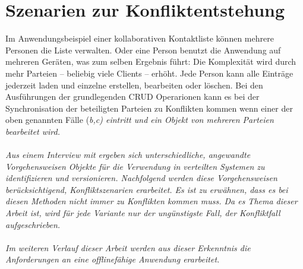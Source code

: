 \section{\label{sec:konfliktszenarien}Szenarien zur Konfliktentstehung}
Im Anwendungsbeispiel einer kollaborativen Kontaktliste können mehrere Personen die Liste verwalten. Oder eine Person benutzt die Anwendung auf mehreren Geräten, was zum selben Ergebnis führt:
Die Komplexität wird durch mehr Parteien -- beliebig viele Clients -- erhöht.
Jede Person kann alle Einträge jederzeit laden und einzelne erstellen, bearbeiten oder löschen. Bei den Ausführungen der grundlegenden \gls{CRUD} Operarionen kann es bei der Synchronisation der beteiligten Parteien zu Konflikten kommen wenn einer der oben genannten Fälle (\it{b,c}) eintritt und ein Objekt von mehreren Parteien bearbeitet wird.\\\\
Aus einem Interview mit  ergeben sich unterschiedliche, angewandte Vorgehensweisen Objekte für die Verwendung in verteilten Systemen zu identifizieren und versionieren. Nachfolgend werden diese Vorgehensweisen berücksichtigend, Konfliktszenarien erarbeitet. Es ist zu erwähnen, dass es bei diesen Methoden nicht immer zu Konflikten kommen muss. Da es Thema dieser Arbeit ist, wird für jede Variante nur der ungünstigste Fall, der Konfliktfall aufgeschrieben.
%
\\\\
Im weiteren Verlauf dieser Arbeit werden aus dieser Erkenntnis die Anforderungen an eine offlinefähige Anwendung erarbeitet.